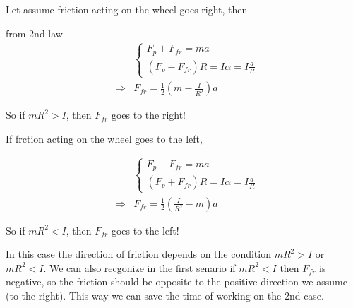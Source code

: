 \documentclass{article}
\begin{document}
\begin{multicols}{2}%

Let assume friction acting on the wheel goes right, then



from 2nd law%
\begin{eqnarray*}
&&\left\{ 
\begin{array}{c}
F_{p}+F_{fr}=ma \\ 
\left( F_{p}-F_{fr}\right) R=I\alpha =I\frac{a}{R}%
\end{array}%
\right. \\
&\Rightarrow &F_{fr}=\frac{1}{2}\left( m-\frac{I}{R^{2}}\right) a
\end{eqnarray*}

So if $mR^{2}>I$, then $F_{fr}$ goes to the right!

\bigskip

If frction acting on the wheel goes to the left,



\begin{eqnarray*}
&&\left\{ 
\begin{array}{c}
F_{p}-F_{fr}=ma \\ 
\left( F_{p}+F_{fr}\right) R=I\alpha =I\frac{a}{R}%
\end{array}%
\right. \\
&\Rightarrow &F_{fr}=\frac{1}{2}\left( \frac{I}{R^{2}}-m\right) a
\end{eqnarray*}

So if $mR^{2}<I$, then $F_{fr}$ goes to the left!

\bigskip

\end{multicols}%

\bigskip

In this case the direction of friction depends on the condition $mR^{2}>I$
or $mR^{2}<I$. We can also recgonize in the first senario if $mR^{2}<I$ then 
$F_{fr}$ is negative, so the friction should be opposite to the positive
direction we assume (to the right). This way we can save the time of working
on the 2nd case.

\bigskip
\end{document}
